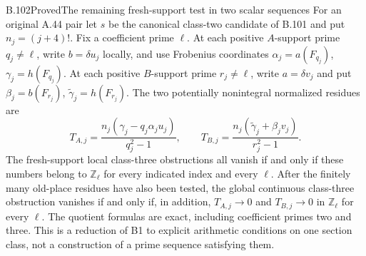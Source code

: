 \begin{result}{B.102}{Proved}{The remaining fresh-support test in two scalar sequences}
For an original A.44 pair let $s$ be the canonical class-two candidate
of B.101 and put $n_j=(j+4)!$. Fix a coefficient prime $\ell$.
At each positive $A$-support prime $q_j\ne\ell$, write
$b=\delta u_j$ locally, and use Frobenius coordinates
$\alpha_j=a(F_{q_j})$, $\gamma_j=h(F_{q_j})$.
At each positive $B$-support prime $r_j\ne\ell$, write
$a=\delta v_j$ and put
$\beta_j=b(F_{r_j})$, $\widetilde\gamma_j=h(F_{r_j})$.
The two potentially nonintegral normalized residues are
\[
T_{A,j}=\frac{n_j(\gamma_j-q_j\alpha_j u_j)}{q_j^2-1},
\qquad
T_{B,j}=\frac{n_j(\widetilde\gamma_j+\beta_jv_j)}{r_j^2-1}.
\]
The fresh-support local class-three obstructions all vanish if and
only if these numbers belong to $\mathbb Z_\ell$ for every indicated
index and every $\ell$. After the finitely many old-place residues
have also been tested, the global continuous class-three obstruction
vanishes if and only if, in addition,
$T_{A,j}\to0$ and $T_{B,j}\to0$ in $\mathbb Z_\ell$ for every $\ell$.
The quotient formulas are exact, including coefficient primes two
and three. This is a reduction of B1 to explicit arithmetic conditions
on one section class, not a construction of a prime sequence satisfying
them.
\end{result}
